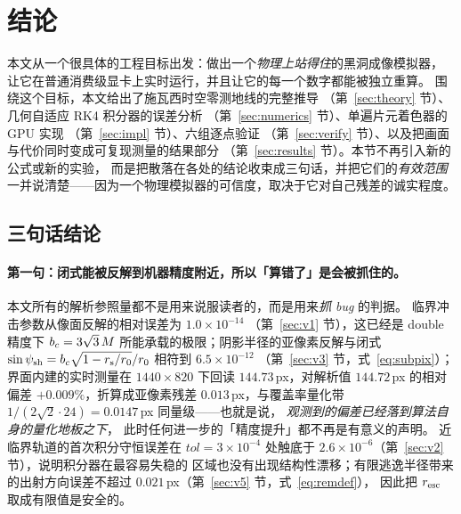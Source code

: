 \section{结论}\label{sec:concl}

本文从一个很具体的工程目标出发：做出一个\emph{物理上站得住}的黑洞成像模拟器，
让它在普通消费级显卡上实时运行，并且让它的每一个数字都能被独立重算。
围绕这个目标，本文给出了施瓦西时空零测地线的完整推导
（第~\ref{sec:theory} 节）、几何自适应 RK4 积分器的误差分析
（第~\ref{sec:numerics} 节）、单遍片元着色器的 GPU 实现
（第~\ref{sec:impl} 节）、六组逐点验证
（第~\ref{sec:verify} 节）、以及把画面与代价同时变成可复现测量的结果部分
（第~\ref{sec:results} 节）。本节不再引入新的公式或新的实验，
而是把散落在各处的结论收束成三句话，并把它们的\emph{有效范围}
一并说清楚——因为一个物理模拟器的可信度，取决于它对自己残差的诚实程度。

\subsection{三句话结论}

\paragraph{第一句：闭式能被反解到机器精度附近，所以「算错了」是会被抓住的。}
本文所有的解析参照量都不是用来说服读者的，而是用来\emph{抓 bug} 的判据。
临界冲击参数从像面反解的相对误差为 $1.0\times10^{-14}$
（第~\ref{sec:v1} 节），这已经是 double 精度下 $b_{c}=3\sqrt3\,M$
所能承载的极限；阴影半径的亚像素反解与闭式
$\sin\psi_{\rm sh}=b_{c}\sqrt{1-r_{\mathrm s}/r_0}/r_0$ 相符到 $6.5\times10^{-12}$
（第~\ref{sec:v3} 节，式~\eqref{eq:subpix}）；界面内建的实时测量在
$1440\times820$ 下回读 $144.73$\,px，对解析值 $144.72$\,px 的相对偏差
$+0.009\%$，折算成亚像素残差 $0.013$\,px，与覆盖率量化带
$1/(2\sqrt2\cdot24)=0.0147$\,px 同量级——也就是说，
\emph{观测到的偏差已经落到算法自身的量化地板之下}，
此时任何进一步的「精度提升」都不再是有意义的声明。
近临界轨道的首次积分守恒误差在 $tol=3\times10^{-4}$ 处触底于
$2.6\times10^{-6}$（第~\ref{sec:v2} 节），说明积分器在最容易失稳的
区域也没有出现结构性漂移；有限逃逸半径带来的出射方向误差不超过
$0.021$\,px（第~\ref{sec:v5} 节，式~\eqref{eq:remdef}），
因此把 $r_{\rm esc}$ 取成有限值是安全的。

